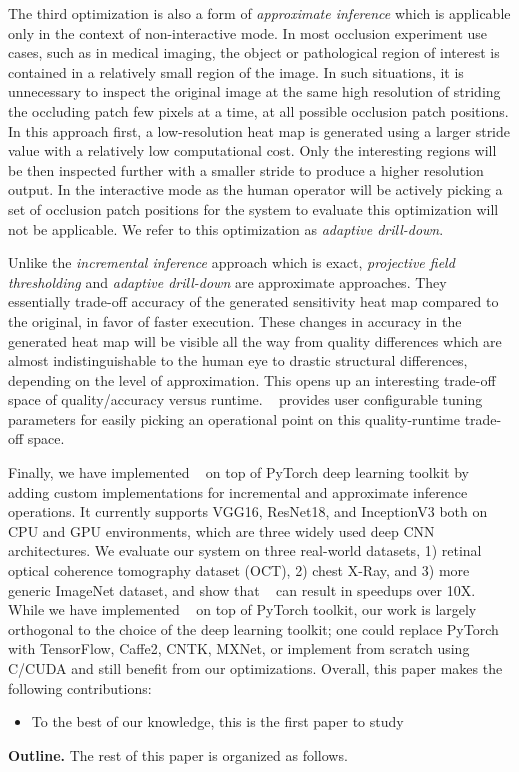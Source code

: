 The third optimization is also a form of \textit{approximate inference} which is applicable only in the context of non-interactive mode.
In most occlusion experiment use cases, such as in medical imaging, the object or pathological region of interest is contained in a relatively small region of the image.
In such situations, it is unnecessary to inspect the original image at the same high resolution of striding the occluding patch few pixels at a time, at all possible occlusion patch positions.
In this approach first, a low-resolution heat map is generated using a larger stride value with a relatively low computational cost.
Only the interesting regions will be then inspected further with a smaller stride to produce a higher resolution output.
In the interactive mode as the human operator will be actively picking a set of occlusion patch positions for the system to evaluate this optimization will not be applicable.
We refer to this optimization as \textit{adaptive drill-down}.


Unlike the \textit{incremental inference} approach which is exact, \textit{projective field thresholding} and \textit{adaptive drill-down} are approximate approaches. They essentially trade-off accuracy of the generated sensitivity heat map compared to the original, in favor of faster execution.
These changes in accuracy in the generated heat map will be visible all the way from quality differences which are almost indistinguishable to the human eye to drastic structural differences, depending on the level of approximation.
This opens up an interesting trade-off space of quality/accuracy versus runtime. \system~ provides user configurable tuning parameters for easily picking an operational point on this quality-runtime trade-off space.

Finally, we have implemented \system~ on top of PyTorch deep learning toolkit  by adding custom implementations for incremental and approximate inference operations.
It currently supports VGG16, ResNet18, and InceptionV3 both on CPU and GPU environments, which are three widely used deep CNN architectures.
We evaluate our system on three real-world datasets, 1) retinal optical coherence tomography dataset (OCT), 2) chest X-Ray, and 3) more generic ImageNet dataset, and show that \system~ can result in speedups over 10X.
While we have implemented \system~ on top of PyTorch toolkit, our work is largely orthogonal to the choice of the deep learning toolkit; one could replace PyTorch with TensorFlow, Caffe2, CNTK, MXNet, or implement from scratch using C/CUDA and still benefit from our optimizations.
Overall, this paper makes the following contributions:

\begin{itemize}
	\item To the best of our knowledge, this is the first paper to study
\end{itemize}

\vspace{2mm}
\noindent \textbf{Outline.} The rest of this paper is organized as follows.
